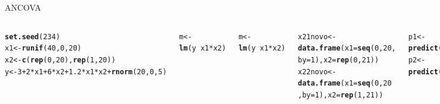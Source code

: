 \documentclass{beamer}\usepackage[]{graphicx}\usepackage[]{color}
\makeatletter
\newcommand{\hlnum}[1]{\textcolor[rgb]{0.686,0.059,0.569}{#1}}%
\newcommand{\hlstr}[1]{\textcolor[rgb]{0.192,0.494,0.8}{#1}}%
\newcommand{\hlopt}[1]{\textcolor[rgb]{0,0,0}{#1}}%
\newcommand{\hlstd}[1]{\textcolor[rgb]{0.345,0.345,0.345}{#1}}%
\newcommand{\hlkwb}[1]{\textcolor[rgb]{0.69,0.353,0.396}{#1}}%
\newcommand{\hlkwc}[1]{\textcolor[rgb]{0.333,0.667,0.333}{#1}}%
\newcommand{\hlkwd}[1]{\textcolor[rgb]{0.737,0.353,0.396}{\textbf{#1}}}%
\newenvironment{kframe}{%
 \def\at@end@of@kframe{}%
 \ifinner\ifhmode%
  \def\at@end@of@kframe{\end{minipage}}%
  \begin{minipage}{\columnwidth}%
 \fi\fi%
 \def\FrameCommand##1{\hskip\@totalleftmargin \hskip-\fboxsep
 \colorbox{shadecolor}{##1}\hskip-\fboxsep
     \hskip-\linewidth \hskip-\@totalleftmargin \hskip\columnwidth}%
 \MakeFramed {\advance\hsize-\width
   \@totalleftmargin\z@ \linewidth\hsize
   \@setminipage}}%
 {\par\unskip\endMakeFramed%
 \at@end@of@kframe}
\newenvironment{knitrout}{}{} %
\renewenvironment{knitrout}{\setlength{\topsep}{0mm}}{}
\makeatother
\begin{document}
\begin{frame}[fragile]{ANCOVA}

\begin{columns}

\setlength{\topsep}{2pt}
\begin{knitrout}\tiny
{}\color{fgcolor}\begin{kframe}
\begin{alltt}
\hlkwd{set.seed}\hlstd{(}\hlnum{234}\hlstd{)}
\hlstd{x1} \hlkwb{<-} \hlkwd{runif}\hlstd{(}\hlnum{40}\hlstd{,}\hlnum{0}\hlstd{,}\hlnum{20}\hlstd{)}
\hlstd{x2} \hlkwb{<-} \hlkwd{c}\hlstd{(}\hlkwd{rep}\hlstd{(}\hlnum{0}\hlstd{,}\hlnum{20}\hlstd{),}\hlkwd{rep}\hlstd{(}\hlnum{1}\hlstd{,}\hlnum{20}\hlstd{))}
\hlstd{y} \hlkwb{<-} \hlnum{3} \hlopt{+} \hlnum{2}\hlopt{*}\hlstd{x1} \hlopt{+} \hlnum{6}\hlopt{*}\hlstd{x2} \hlopt{+} \hlnum{1.2}\hlopt{*}\hlstd{x1}\hlopt{*}\hlstd{x2} \hlopt{+} \hlkwd{rnorm}\hlstd{(}\hlnum{20}\hlstd{,}\hlnum{0}\hlstd{,}\hlnum{5}\hlstd{)}

\hlstd{m} \hlkwb{<-} \hlkwd{lm}\hlstd{(y} \hlopt{~} \hlstd{x1} \hlopt{*} \hlstd{x2)}

\hlstd{m} \hlkwb{<-} \hlkwd{lm}\hlstd{(y} \hlopt{~} \hlstd{x1} \hlopt{*} \hlstd{x2)}

\hlstd{x21novo} \hlkwb{<-} \hlkwd{data.frame}\hlstd{(}\hlkwc{x1} \hlstd{=} \hlkwd{seq}\hlstd{(}\hlnum{0}\hlstd{,}\hlnum{20}\hlstd{,}
                \hlkwc{by}\hlstd{=}\hlnum{1}\hlstd{),} \hlkwc{x2}\hlstd{=}\hlkwd{rep}\hlstd{(}\hlnum{0}\hlstd{,}\hlnum{21}\hlstd{))}
\hlstd{x22novo} \hlkwb{<-} \hlkwd{data.frame}\hlstd{(}\hlkwc{x1} \hlstd{=} \hlkwd{seq}\hlstd{(}\hlnum{0}\hlstd{,}\hlnum{20}
                       \hlstd{,}\hlkwc{by}\hlstd{=}\hlnum{1}\hlstd{),} \hlkwc{x2}\hlstd{=}\hlkwd{rep}\hlstd{(}\hlnum{1}\hlstd{,}\hlnum{21}\hlstd{))}

\hlstd{p1} \hlkwb{<-} \hlkwd{predict}\hlstd{(m,x21novo)}
\hlstd{p2} \hlkwb{<-} \hlkwd{predict}\hlstd{(m,x22novo)}

\hlkwd{plot}\hlstd{(x1,y,} \hlkwc{pch}\hlstd{=}\hlnum{19}\hlstd{,} \hlkwc{col}\hlstd{=col)}

\hlkwd{lines}\hlstd{(}\hlkwd{seq}\hlstd{(}\hlnum{0}\hlstd{,}\hlnum{20}\hlstd{,}\hlkwc{by}\hlstd{=}\hlnum{1}\hlstd{),p1,} \hlkwc{lwd}\hlstd{=}\hlnum{2}\hlstd{,}\hlkwc{col}\hlstd{=}\hlstr{'blue'}\hlstd{)}
\hlkwd{lines}\hlstd{(}\hlkwd{seq}\hlstd{(}\hlnum{0}\hlstd{,}\hlnum{20}\hlstd{,}\hlkwc{by}\hlstd{=}\hlnum{1}\hlstd{),p2,} \hlkwc{lwd}\hlstd{=}\hlnum{2}\hlstd{,}\hlkwc{col}\hlstd{=}\hlstr{'red'}\hlstd{)}
\end{alltt}
\end{kframe}
\end{knitrout}


\end{columns}
\end{frame}
\end{document}
